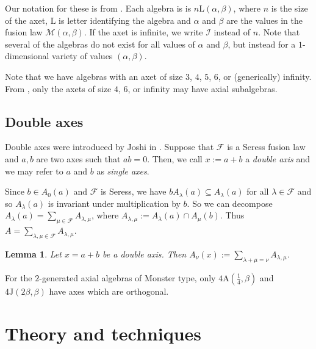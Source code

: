 \documentclass[11pt, a4paper]{article}
\theoremstyle{plain}
\newtheorem{lemma}[theorem]{Lemma}
\newtheorem{proposition}[theorem]{Proposition}
\theoremstyle{definition}
\newcommand\al{\alpha}
\newcommand\bt{\beta}
\newcommand\lm{\lambda}
\newcommand\cF{\mathcal{F}}
\newcommand\cM{\mathcal{M}}
\newcommand{\A}{\mathrm{A}}
\newcommand{\J}{\mathrm{J}}
\newcommand{\0}{\overline{0}}
\newcommand{\2}{\overline{2}}
\newcommand{\1}{\mathbbm{1}}
\begin{document}
Our notation for these is from \cite{forbidden}.  Each algebra is is $n\mathrm{L}(\al,\bt)$, where $n$ is the size of the axet, $\mathrm{L}$ is letter identifying the algebra and $\al$ and $\bt$ are the values in the fusion law $\cM(\al,\bt)$.  If the axet is infinite, we write $\mathcal{I}$ instead of $n$.  Note that several of the algebras do not exist for all values of $\al$ and $\bt$, but instead for a $1$-dimensional variety of values $(\al, \bt)$.

Note that we have algebras with an axet of size $3$, $4$, $5$, $6$, or (generically) infinity.  From \cite{forbidden}, only the axets of size $4$, $6$, or infinity may have axial subalgebras.


\subsection{Double axes}


Double axes were introduced by Joshi in \cite{JoshiMRes}.  Suppose that $\cF$ is a Seress fusion law and $a,b$ are two axes such that $ab = 0$.  Then, we call $x := a+b$ a \emph{double axis} and we may refer to $a$ and $b$ as \emph{single axes}.

Since $b \in A_0(a)$ and $\cF$ is Seress, we have $bA_\lm(a) \subseteq A_\lm(a)$ for all $\lm \in \cF$ and so $A_\lm(a)$ is invariant under multiplication by $b$.  So we can decompose $A_\lm(a) = \sum_{\mu \in \cF} A_{\lm,\mu}$, where $A_{\lm, \mu} := A_\lm(a) \cap A_\mu(b)$.  Thus $A =  \sum_{\lm,\mu \in \cF} A_{\lm,\mu}$.

\begin{lemma}\label{doubleespace}
Let $x = a+b$ be a double axis.  Then $A_\nu(x) := \sum_{\lm+\mu =\nu} A_{\lm,\mu}$.
\end{lemma}



For the $2$-generated axial algebras of Monster type, only $4\A(\frac{1}{4}, \bt)$ and $4\J(2\bt, \bt)$ have axes which are orthogonal.



\section{Theory and techniques}\label{sec:tech}
\end{document}
